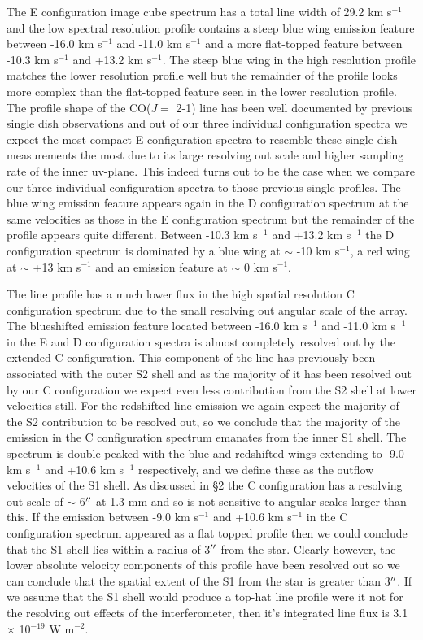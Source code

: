 \documentclass[iop]{emulateapj}
\begin{document}
The E configuration image cube spectrum has a total line width of 29.2 km s${}^{-1}$ and the low spectral resolution profile contains a steep blue wing emission feature between -16.0 km s${}^{-1}$ and -11.0 km s${}^{-1}$ and a more flat-topped feature between -10.3 km s${}^{-1}$ and +13.2 km s${}^{-1}$. The steep blue wing in the high resolution profile matches the lower resolution profile well but the  remainder of the profile looks more complex than the flat-topped feature seen in the lower resolution profile. The profile shape of the CO($J=$ 2-1) line has been well documented by previous single dish observations \citep[e.g.][]{1980ApJ...242L..25K, 1987ApJ...313..400H} and out of our three individual configuration spectra we expect the most compact E configuration spectra to resemble these single dish measurements the most due to its large resolving out scale and higher sampling rate of the inner uv-plane. This indeed turns out to be the case when we compare our three individual configuration spectra to those previous single profiles. The blue wing emission feature appears again in the D configuration spectrum at the same velocities as those in the E configuration spectrum but the remainder of the profile appears quite different. Between -10.3 km s${}^{-1}$ and +13.2 km s${}^{-1}$ the D configuration spectrum is dominated by a blue wing at $\sim$ -10 km s${}^{-1}$, a red wing at $\sim$ +13 km s${}^{-1}$ and an emission feature at $\sim$ 0 km s${}^{-1}$. 

The line profile has a much lower flux in the high spatial resolution C configuration spectrum due to the small resolving out angular scale of the array. The blueshifted emission feature located between -16.0 km s${}^{-1}$ and -11.0 km s${}^{-1}$ in the E and D configuration spectra is almost completely resolved out by the extended C configuration. This component of the line has previously been associated with the outer S2 shell \citep{1987ApJ...313..400H} and as the majority of it has been resolved out by our C configuration we expect even less contribution from the S2 shell at lower velocities still. For the redshifted line emission we again expect the majority of the S2 contribution to be resolved out, so we conclude that the majority of the emission in the C configuration spectrum emanates from the inner S1 shell. The spectrum is double peaked with the blue and redshifted wings extending to -9.0 km s${}^{-1}$ and +10.6 km s${}^{-1}$ respectively, and we define these as the outflow velocities of the S1 shell. As discussed in \S2 the C configuration has a resolving out scale of $\sim$ 6$\mbox{$^{\prime\prime}$}$ at 1.3 mm and so is not sensitive to angular scales larger than this. If the emission between -9.0 km s${}^{-1}$ and +10.6 km s${}^{-1}$ in the C configuration spectrum appeared as a flat topped profile then we could conclude that the S1 shell lies within a radius of 3$\mbox{$^{\prime\prime}$}$ from the star. Clearly however, the lower absolute velocity components of this profile have been resolved out so we can conclude that the spatial extent of the S1 from the star is greater than 3$\mbox{$^{\prime\prime}$}$. If we assume that the S1 shell would produce a top-hat line profile were it not for the resolving out effects of the interferometer, then it's integrated line flux is 3.1 $\times$ 10${}^{-19}$ W m${}^{-2}$.
\end{document}
